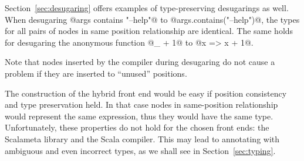 \documentclass[11pt]{amsart}
\begin{document}
%

Section~\ref{sec:desugaring} offers examples of type-preserving
desugarings as well.
When desugaring @args contains "--help"@ to @args.contains("--help")@,
the \linebreak types for all pairs of nodes in same position relationship are identical.
The same holds for desugaring the anonymous function @_ + 1@ to @x => x + 1@.

Note that nodes inserted by the compiler during desugaring do not cause a problem
if they are inserted to ``unused'' positions.


The construction of the hybrid front end would be easy if position consistency
and type preservation held. In that case nodes in same-position relationship
would represent the same expression, thus they would have the same type.
Unfortunately, these properties do not hold for the chosen front ends:
the Scalameta library and the Scala compiler.
This may lead to annotating with ambiguous and even incorrect types, as we
shall see in Section~\ref{sec:typing}.

%
\end{document}
